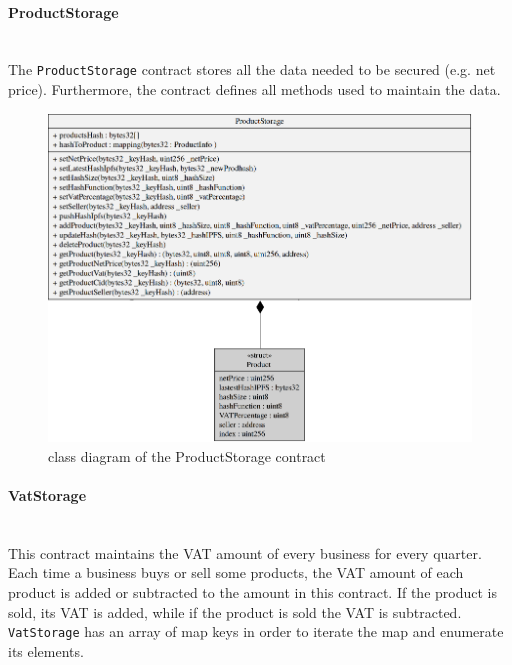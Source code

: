 \paragraph{ProductStorage}\mbox{}\\

\noindent The \texttt{ProductStorage} contract stores all the data needed to be secured (e.g. net price). Furthermore, the contract defines all methods used to maintain the data. 
\begin{figure}[H]
	\centering
	\includegraphics[scale=0.45]{res/images/solidity/productstorage.png}
	\caption{class diagram of the ProductStorage contract}
\end{figure}
\pagebreak
\paragraph{VatStorage}\mbox{}\\
This contract maintains the VAT amount of every business for every quarter. Each time a business buys or sell some products, the VAT amount of each product is added or subtracted to the amount in this contract. If the product is sold, its VAT is added, while if the product is sold the VAT is subtracted. \\
\texttt{VatStorage} has an array of map keys in order to iterate the map and enumerate its elements. 

